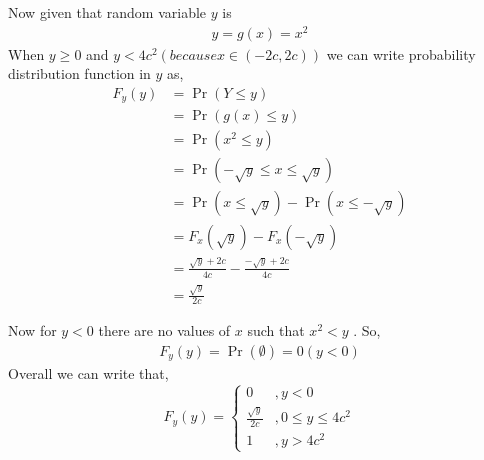 \documentclass{beamer}
\providecommand{\pr}[1]{\ensuremath{\Pr\left(#1\right)}}
\providecommand{\brak}[1]{\ensuremath{\left(#1\right)}}
\begin{document}
\begin{frame}
            Now given that random variable $y$ is
                      \begin{align}
                                 y = g\brak{x}= x^2
                       \end{align}                                 
               When $ y \geq 0 $ and $ y < 4c^2 \brak{because x \in \brak{-2c,2c}}$ we can write probability distribution function in $y$ as,
                     \begin{align}
                              F_{y}\brak{y} &= \pr{Y \leq y}\\
                                                   &= \pr{g\brak{x} \leq y}\\
                                                   &= \pr{x^2 \leq y}\\
                                                   &= \pr{-\sqrt{y} \leq x \leq \sqrt{y}} \\
                                                   & = \pr{ x \leq \sqrt{y}} - \pr{ x \leq -\sqrt{y}} \\
                                                   & = F_{x}\brak{\sqrt{y}} - F_{x}\brak{-\sqrt{y}} \\
                                                   & = \frac{\sqrt{y} +2c}{4c} - \frac{-\sqrt{y} +2c}{4c} \\
                                                   & = \frac{\sqrt{y}}{2c}
                      \end{align}
\end{frame}
\begin{frame}
               Now for $ y < 0 $ there are no values of $x$ such that $ x^2 < y $ . So,
                              \begin{align}
                                     F_{y}\brak{y} = \pr{\emptyset} = 0 \brak{y<0}
                               \end{align}
            Overall we can write that,
                      \begin{equation*}
                               F_{y}\brak{y} = \begin{cases}
                                                          0  &, y < 0 \\
                                                         \frac{\sqrt{y}}{2c} &, 0\leq y \leq 4c^2 \\
                                                         1  & , y > 4c^2
                                                        \end{cases}
                      \end{equation*}
\end{frame}
\end{document}
